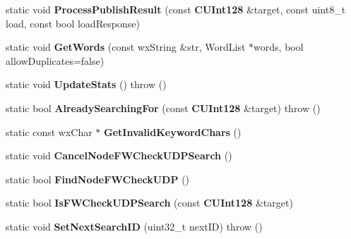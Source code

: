 \begin{DoxyCompactItemize}
\item 
static void {\bfseries ProcessPublishResult} (const {\bf CUInt128} \&target, const uint8\_\-t load, const bool loadResponse)\label{classKademlia_1_1CSearchManager_abe4f081f5d8f072624c6b4eaf12d2a69}

\item 
static void {\bfseries GetWords} (const wxString \&str, WordList $\ast$words, bool allowDuplicates=false)\label{classKademlia_1_1CSearchManager_ab65ef94dcc84dd28ab3650acf7283e2a}

\item 
static void {\bfseries UpdateStats} ()  throw ()\label{classKademlia_1_1CSearchManager_af17bfe6ae65eba1b608bd41b8c37fd78}

\item 
static bool {\bfseries AlreadySearchingFor} (const {\bf CUInt128} \&target)  throw ()\label{classKademlia_1_1CSearchManager_ab9af49914b08fd42a815e74f9f5d39be}

\item 
static const wxChar $\ast$ {\bfseries GetInvalidKeywordChars} ()\label{classKademlia_1_1CSearchManager_aa4d4200413ef50371c6881bd671a9f81}

\item 
static void {\bfseries CancelNodeFWCheckUDPSearch} ()\label{classKademlia_1_1CSearchManager_a161fa6f9deaa2a913d6d0167a89729c4}

\item 
static bool {\bfseries FindNodeFWCheckUDP} ()\label{classKademlia_1_1CSearchManager_a0339eaf6ae724218605a30753bed903c}

\item 
static bool {\bfseries IsFWCheckUDPSearch} (const {\bf CUInt128} \&target)\label{classKademlia_1_1CSearchManager_a5cc4594a148b57e4a1410a4308865aa7}

\item 
static void {\bfseries SetNextSearchID} (uint32\_\-t nextID)  throw ()\label{classKademlia_1_1CSearchManager_af7f360f99bcfc3fe588d9f923d6266ba}

\end{DoxyCompactItemize}
